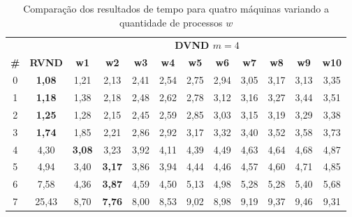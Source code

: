 \begin{table}[htbp]
\caption{Comparação dos resultados de tempo para quatro máquinas variando a quantidade de processos $w$}
\begin{center}
\begin{tabular}{cccccccccccc}
\hline
\hline
\multicolumn{2}{c}{} &\multicolumn{10}{c}{\textbf{DVND $m=4$}} \\
\cline{3-12}
\textbf{\#} & \textbf{RVND}& \textbf{w1}& \textbf{w2}& \textbf{w3}& \textbf{w4}& \textbf{w5}& \textbf{w6}& \textbf{w7}& \textbf{w8}& \textbf{w9}& \textbf{w10} \\
\hline
0 & \textbf{1,08}&1,21&2,13&2,41&2,54&2,75&2,94&3,05&3,17&3,13&3,35 \\
1 & \textbf{1,18}&1,38&2,18&2,48&2,62&2,78&3,12&3,16&3,27&3,44&3,51 \\
2 & \textbf{1,25}&1,28&2,15&2,45&2,59&2,85&3,03&3,15&3,19&3,29&3,38 \\
3 & \textbf{1,74}&1,85&2,21&2,86&2,92&3,17&3,32&3,40&3,52&3,58&3,73 \\
4 & 4,30&\textbf{3,08}&3,23&3,92&4,11&4,39&4,49&4,63&4,64&4,68&4,87 \\
5 & 4,94&3,40&\textbf{3,17}&3,86&3,94&4,44&4,46&4,57&4,60&4,71&4,85 \\
6 & 7,58&4,36&\textbf{3,87}&4,59&4,50&5,13&4,98&5,28&5,28&5,40&5,68 \\
7 & 25,43&8,70&\textbf{7,76}&8,00&8,53&9,02&8,98&9,19&9,37&9,46&9,31 \\
\hline
\end{tabular}
\label{tab:rvndDvndN4times}
\end{center}
\end{table}